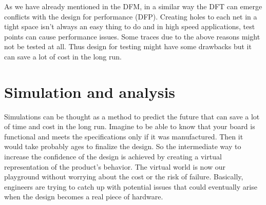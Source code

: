 \documentclass[final]{cubedoc}
\begin{document}
	
	
	
	As we have already mentioned in the DFM, in a similar way the DFT can emerge conflicts with the design for performance (DFP). Creating holes to each net in a tight space isn't always an easy thing to do and in high speed applications, test points can cause performance issues. Some traces due to the above reasons might not be tested at all. Thus design for testing might have some drawbacks but it can save a lot of cost in the long run. 
	
	
	
	
	
	\section{Simulation and analysis}
	
	Simulations can be thought as a method to predict the future that can save a lot of time and cost in the long run. Imagine to be able to know that your board is functional and meets the specifications only if it was manufactured. Then it would take probably ages to finalize the design. So the intermediate way to increase the confidence of the design is achieved by creating a virtual representation of the product's behavior. The virtual world is now our playground without worrying about the cost or the risk of failure. Basically, engineers are trying to catch up with potential issues that could eventually arise when the design becomes a real piece of hardware.
	
	
\end{document}
